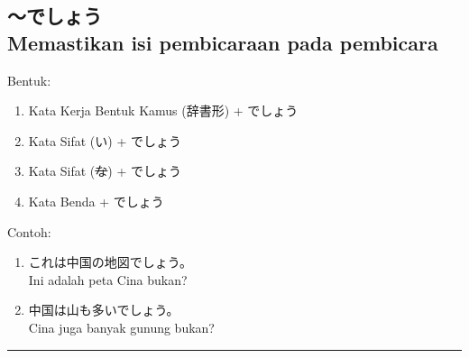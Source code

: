 \subsection*{
    ～でしょう \\
    Memastikan isi pembicaraan pada pembicara
}
Bentuk:
\begin{enumerate}
    \item Kata Kerja Bentuk Kamus (辞書形) + でしょう
    \item Kata Sifat (い) + でしょう
    \item Kata Sifat (\sout{な}) + でしょう
    \item Kata Benda + でしょう 
\end{enumerate}
Contoh: 
\begin{enumerate}
    \item これは中国の地図でしょう。
    \\ Ini adalah peta Cina bukan?
    \item 中国は山も多いでしょう。
    \\ Cina juga banyak gunung bukan?
\end{enumerate}

\vspace{0.2cm}\hrule height 1pt\vspace{0.2cm}
